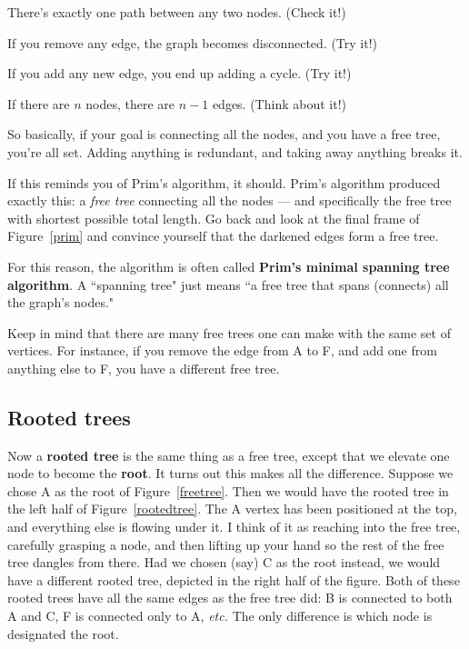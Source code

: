 \begin{compactenum}
\item There's exactly one path between any two nodes. (Check it!)
\item If you remove any edge, the graph becomes disconnected. (Try it!)
\item If you add any new edge, you end up adding a cycle. (Try it!)
\item \label{onelessedge} If there are $n$ nodes, there are $n-1$ edges. (Think about it!)
\end{compactenum}

So basically, if your goal is connecting all the nodes, and you have a free
tree, you're all set. Adding anything is redundant, and taking away
anything breaks it.

If this reminds you of Prim's algorithm, it should. Prim's algorithm
produced exactly this: a \textit{free tree} connecting all the nodes ---
and specifically the free tree with shortest possible total length. Go back
and look at the final frame of Figure~\ref{prim} and convince yourself that
the darkened edges form a free tree.

For this reason, the algorithm is often called \textbf{Prim's minimal
spanning tree algorithm}. A ``spanning tree" just means ``a free tree that
spans (connects) all the graph's nodes." 

Keep in mind that there are many free trees one can make with the same set
of vertices. For instance, if you remove the edge from A to F, and add one
from anything else to F, you have a different free tree.

\subsection{Rooted trees}

Now a \textbf{rooted tree} is the same thing as a free tree, except that we
elevate one node to become the \textbf{root}. It turns out this makes all
the difference. Suppose we chose A as the root of Figure~\ref{freetree}.
Then we would have the rooted tree in the left half of
Figure~\ref{rootedtree}. The A vertex has been positioned at the top, and
everything else is flowing under it. I think of it as reaching into the
free tree, carefully grasping a node, and then lifting up your hand so the
rest of the free tree dangles from there. Had we chosen (say) C as the root
instead, we would have a different rooted tree, depicted in the right half
of the figure. Both of these rooted trees have all the same edges as the
free tree did: B is connected to both A and C, F is connected only to A,
\textit{etc.} The only difference is which node is designated the root.

